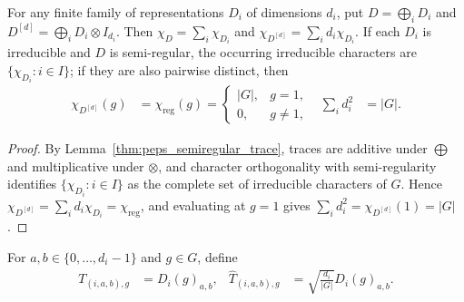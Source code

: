\begin{lemma}%
    \label{thm:peps_semiregular_regular_character}
    \leanok
    For any finite family of representations $D_i$ of dimensions $d_i$,
    put $D=\bigoplus_iD_i$ and $D^{[d]}=\bigoplus_iD_i\otimes I_{d_i}$.
    Then $\chi_D=\sum_i\chi_{D_i}$ and
    $\chi_{D^{[d]}}=\sum_id_i\chi_{D_i}$.
    If each $D_i$ is irreducible and $D$ is semi-regular, the occurring
    irreducible characters are $\{\chi_{D_i}:i\in I\}$; if they are also
    pairwise distinct, then
    \begin{align}
        \chi_{D^{[d]}}(g) & =\chi_{\mathrm{reg}}(g)
        =\begin{cases}|G|,&g=1,\\0,&g\ne1,\end{cases}
                          & \sum_i d_i^2            & =|G|.
        \label{eq:peps_semiregular_regular_character}
    \end{align}
\end{lemma}
\begin{proof}\leanok
    By Lemma~\ref{thm:peps_semiregular_trace}, traces are additive under
    $\bigoplus$ and multiplicative under $\otimes$, and character
    orthogonality with semi-regularity identifies $\{\chi_{D_i}:i\in I\}$ as
    the complete set of irreducible characters of $G$. Hence
    $\chi_{D^{[d]}}=\sum_id_i\chi_{D_i}=\chi_{\mathrm{reg}}$, and evaluating
    at $g=1$ gives $\sum_i d_i^2=\chi_{D^{[d]}}(1)=|G|$.
\end{proof}

\begin{definition}%
    \label{def:peps_semiregular_block_fourier}
    \leanok
    For $a,b\in\{0,\ldots,d_i-1\}$ and $g\in G$, define
    \begin{align}
        T_{(i,a,b),g} & =D_i(g)_{a,b},
                      & \widehat T_{(i,a,b),g} & =\sqrt{\frac{d_i}{|G|}}D_i(g)_{a,b}.
        \label{eq:peps_semiregular_block_fourier}
    \end{align}
\end{definition}

